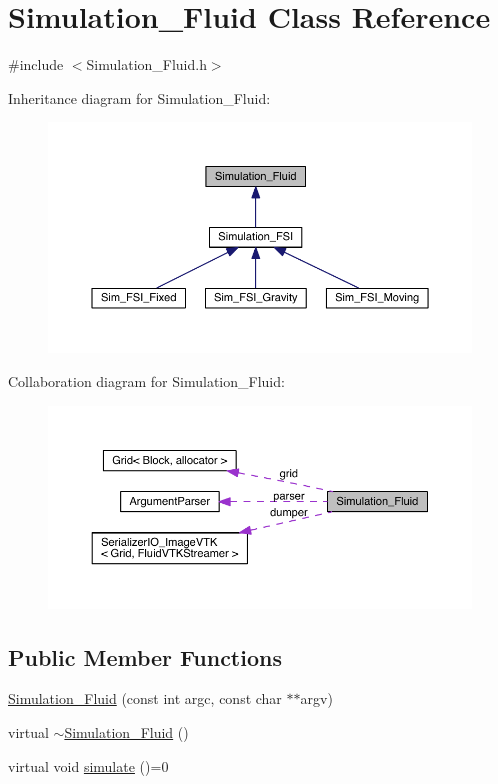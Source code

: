 \hypertarget{class_simulation___fluid}{}\section{Simulation\+\_\+\+Fluid Class Reference}
\label{class_simulation___fluid}


{\ttfamily \#include $<$Simulation\+\_\+\+Fluid.\+h$>$}



Inheritance diagram for Simulation\+\_\+\+Fluid\+:
\nopagebreak
\begin{figure}[H]
\begin{center}
\leavevmode
\includegraphics[width=350pt]{d1/d38/class_simulation___fluid__inherit__graph}
\end{center}
\end{figure}


Collaboration diagram for Simulation\+\_\+\+Fluid\+:
\nopagebreak
\begin{figure}[H]
\begin{center}
\leavevmode
\includegraphics[width=350pt]{d0/d06/class_simulation___fluid__coll__graph}
\end{center}
\end{figure}
\subsection*{Public Member Functions}
\begin{DoxyCompactItemize}
\item 
\hyperlink{class_simulation___fluid_ad06473e56135a5423660fe985380086c}{Simulation\+\_\+\+Fluid} (const int argc, const char $\ast$$\ast$argv)
\item 
virtual \hyperlink{class_simulation___fluid_a149b5d59753ed87c23793ce27e4b09cb}{$\sim$\+Simulation\+\_\+\+Fluid} ()
\item 
virtual void \hyperlink{class_simulation___fluid_a81e2754617245ce69346272181a5de78}{simulate} ()=0
\end{DoxyCompactItemize}
